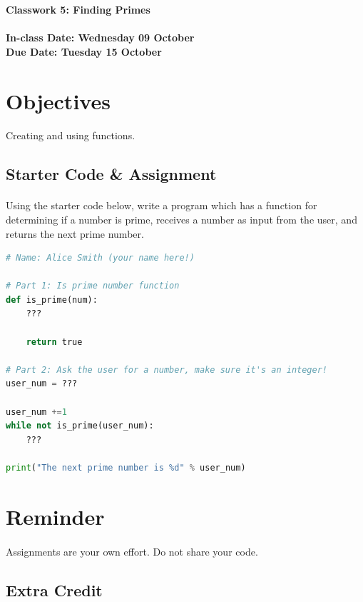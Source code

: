 \documentclass[letter,10pt]{article}
\begin{document}
    \huge
    \textbf{Classwork 5: Finding Primes}
    \normalsize
    \\ ~~ \\
    \textbf{In-class Date: Wednesday 09 October} \\
    \textbf{Due Date: Tuesday 15 October}
    
    \section*{Objectives}
    \paragraph{}Creating and using functions.
    
    \subsection*{Starter Code \& Assignment}
    \paragraph{}Using the starter code below, write a program which has a function for determining if a number is prime, receives a number as input from the user, and returns the next prime number.
    
    \begin{lstlisting}[language=python]
# Name: Alice Smith (your name here!)

# Part 1: Is prime number function
def is_prime(num):
    ???
    
    return true

# Part 2: Ask the user for a number, make sure it's an integer!
user_num = ???

user_num +=1
while not is_prime(user_num):
    ???

print("The next prime number is %d" % user_num)
    \end{lstlisting}
    
    \section*{Reminder}
    \paragraph{}Assignments are your own effort. Do not share your code.
    
    \subsection*{Extra Credit}
\end{document}

